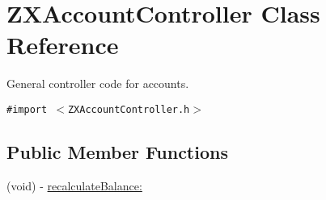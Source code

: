 \hypertarget{interface_z_x_account_controller}{
\section{ZXAccountController Class Reference}
\label{interface_z_x_account_controller}
}
General controller code for accounts.  


{\tt \#import $<$ZXAccountController.h$>$}

\subsection*{Public Member Functions}
\begin{CompactItemize}
\item 
\hypertarget{interface_z_x_account_controller_5fb3f31204f14f03e841ad1c428839ac}{
(void) - \hyperlink{interface_z_x_account_controller_5fb3f31204f14f03e841ad1c428839ac}{recalculateBalance:}}
\label{interface_z_x_account_controller_5fb3f31204f14f03e841ad1c428839ac}


\end{CompactItemize}
